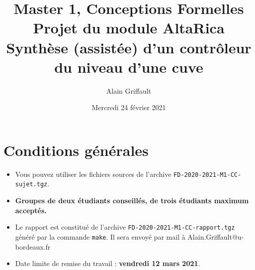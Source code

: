 \documentclass[a4paper]{article}
\newcommand{\altarica}{{\sc AltaRica}}
\begin{document}
\title{Master 1, Conceptions Formelles\\
Projet du module \altarica\\
Synthèse (assistée) d'un contrôleur du niveau d'une cuve}

\date{Mercredi 24 février 2021}

\author{Alain Griffault}

\maketitle



\section{Conditions générales}

\begin{itemize}
\item Vous pouvez utiliser les fichiers sources de l'archive {\tt FD-2020-2021-M1-CC-sujet.tgz}.
\item {\bf Groupes de deux étudiants conseillés, de trois étudiants maximum acceptés.}
\item Le rapport est constitué de l'archive {\tt FD-2020-2021-M1-CC-rapport.tgz} généré par la commande {\tt make}. Il sera envoyé par mail à Alain.Griffault@u-bordeaux.fr
\item Date limite de remise du travail : {\bf vendredi 12 mars 2021}.
\end{itemize}
\end{document}
